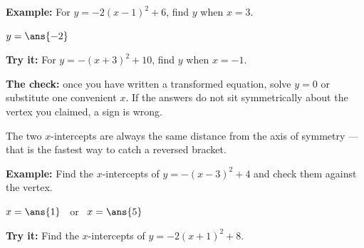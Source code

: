 \documentclass[12pt]{article}
\begin{document}
\begin{examplebox}
\textbf{Example:} \quad For $y = -2(x-1)^2 + 6$, find $y$ when $x = 3$.
\par
$y = \ans{-2}$
\end{examplebox}

\begin{tryitbox}
\textbf{Try it:} \quad For $y = -(x+3)^2 + 10$, find $y$ when $x = -1$.\\[2pt]
\end{tryitbox}


\begin{formulabox}
\textbf{The check:} once you have written a transformed equation, solve $y = 0$ or substitute one convenient $x$. If the answers do not sit symmetrically about the vertex you claimed, a sign is wrong.\par\smallskip
The two $x$-intercepts are always the same distance from the axis of symmetry --- that is the fastest way to catch a reversed bracket.
\end{formulabox}

\begin{examplebox}
\textbf{Example:} \quad Find the $x$-intercepts of $y = -(x-3)^2 + 4$ and check them against the vertex.
\par
$x = \ans{1}$ \ or \ $x = \ans{5}$
\end{examplebox}

\begin{tryitbox}
\textbf{Try it:} \quad Find the $x$-intercepts of $y = -2(x+1)^2 + 8$.\\[2pt]
\end{tryitbox}
\end{document}
